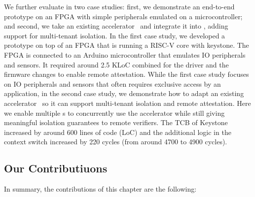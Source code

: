 We further evaluate \name{} in two case studies: first, we demonstrate an end-to-end prototype on an FPGA with simple peripherals emulated on a microcontroller; and second, we take an existing accelerator~\cite{zaruba2020manticore} and integrate it into \name{}, adding support for multi-tenant isolation. In the first case study, we developed a prototype on top of an FPGA that is running a RISC-V core with keystone. The FPGA is connected to an Arduino microcontroller that emulates IO peripherals and sensors. It required around 2.5 KLoC combined for the driver and the firmware changes to enable remote attestation. 
While the first case study focuses on IO peripherals and sensors that often requires exclusive access by an application, in the second case study, we demonstrate how to adapt an existing accelerator~\cite{zaruba2020manticore} so it can support multi-tenant isolation and remote attestation. Here we enable multiple \name{}s to concurrently use the accelerator  while still giving meaningful isolation guarantees to remote verifiers. The TCB of Keystone increased by around $600$ lines of code (LoC) and the additional logic in the context switch increased by 220 cycles (from around 4700 to 4900 cycles). 

\subsection{Our Contributiuons}

In summary, the contributions of this chapter are the following:

